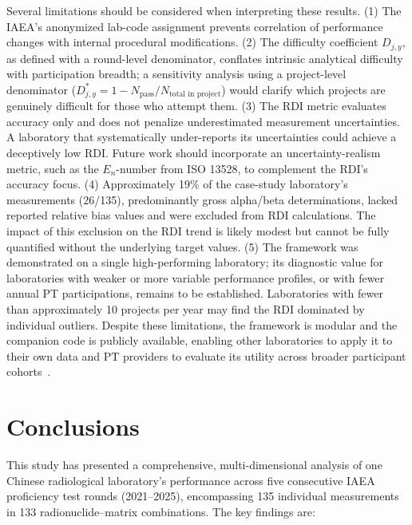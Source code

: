 \documentclass[12pt,a4paper,twoside]{article}
\begin{document}
Several limitations should be considered when interpreting these results. (1) The IAEA's anonymized lab-code assignment prevents correlation of performance changes with internal procedural modifications. (2) The difficulty coefficient $D_{j,y}$, as defined with a round-level denominator, conflates intrinsic analytical difficulty with participation breadth; a sensitivity analysis using a project-level denominator ($D^*_{j,y} = 1 - N_{\text{pass}}/N_{\text{total in project}}$) would clarify which projects are genuinely difficult for those who attempt them. (3) The RDI metric evaluates accuracy only and does not penalize underestimated measurement uncertainties. A laboratory that systematically under-reports its uncertainties could achieve a deceptively low RDI. Future work should incorporate an uncertainty-realism metric, such as the $E_n$-number from ISO 13528, to complement the RDI's accuracy focus. (4) Approximately 19\% of the case-study laboratory's measurements (26/135), predominantly gross alpha/beta determinations, lacked reported relative bias values and were excluded from RDI calculations. The impact of this exclusion on the RDI trend is likely modest but cannot be fully quantified without the underlying target values. (5) The framework was demonstrated on a single high-performing laboratory; its diagnostic value for laboratories with weaker or more variable performance profiles, or with fewer annual PT participations, remains to be established. Laboratories with fewer than approximately 10 projects per year may find the RDI dominated by individual outliers. Despite these limitations, the framework is modular and the companion code is publicly available, enabling other laboratories to apply it to their own data and PT providers to evaluate its utility across broader participant cohorts~\cite{povinec2001,alenitz1995}.

\section{Conclusions}

This study has presented a comprehensive, multi-dimensional analysis of one Chinese radiological laboratory's performance across five consecutive IAEA proficiency test rounds (2021--2025), encompassing 135 individual measurements in 133 radionuclide--matrix combinations. The key findings are:
\end{document}
